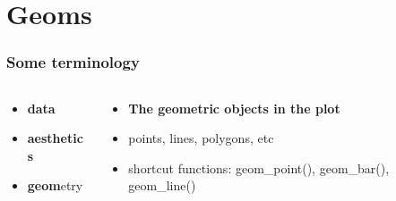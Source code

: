 \documentclass{beamer}\usepackage[]{graphicx}\usepackage[]{color}
\begin{document}

\section*{Geoms}
\frame{\sectionpage}


\begin{frame}[fragile]
\frametitle{Some terminology}
\begin{columns}[t]

\begin{column}[T]{3cm}
\begin{itemize}
    \item \textbf{\color{gray}data}
    \item \textbf{\color{gray}aesthetics}
    \item \textbf{geom}etry
\end{itemize}
\end{column}

\begin{column}[T]{8cm}
\begin{itemize}
    \item \textbf{The geometric objects in the plot}
    \item points, lines, polygons, etc
    \item shortcut functions: geom\_point(), geom\_bar(), geom\_line()
\end{itemize}
\end{column}

\end{columns}
\end{frame}

\end{document}
